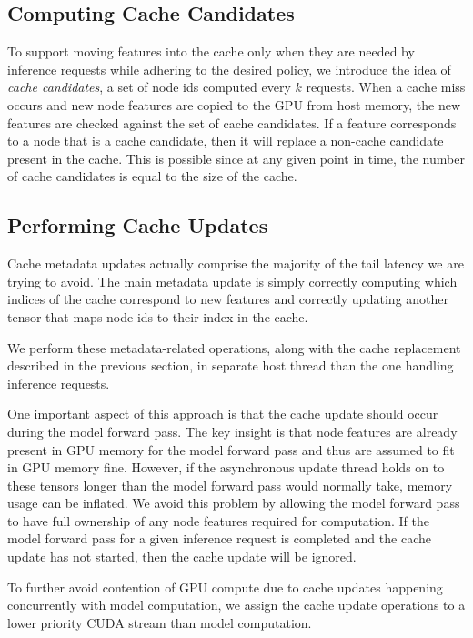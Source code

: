 \subsection{Computing Cache Candidates} \label{Design: Cache candidates}
To support moving features into the cache only when they are needed by inference requests while adhering to the desired policy, we introduce the idea of \textit{cache candidates}, a set of node ids computed every $k$ requests. When a cache miss occurs and new node features are copied to the GPU from host memory, the new features are checked against the set of cache candidates. If a feature corresponds to a node that is a cache candidate, then it will replace a non-cache candidate present in the cache. This is possible since at any given point in time, the number of cache candidates is equal to the size of the cache.


\subsection{Performing Cache Updates}
Cache metadata updates actually comprise the majority of the tail latency we are trying to avoid. 
The main metadata update is simply correctly computing which indices of the cache correspond to new features and correctly updating another tensor that maps node ids to their index in the cache.

We perform these metadata-related operations, along with the cache replacement described in the previous section, in separate host thread than the one handling inference requests. 

One important aspect of this approach is that the cache update should occur during the model forward pass.
The key insight is that node features are already present in GPU memory for the model forward pass and thus are assumed to fit in GPU memory fine.
However, if the asynchronous update thread holds on to these tensors longer than the model forward pass would normally take, memory usage can be inflated. 
We avoid this problem by allowing the model forward pass to have full ownership of any node features required for computation.
If the model forward pass for a given inference request is completed and the cache update has not started, then the cache update will be ignored.

To further avoid contention of GPU compute due to cache updates happening concurrently with model computation, we assign the cache update operations to a lower priority CUDA stream than model computation.

